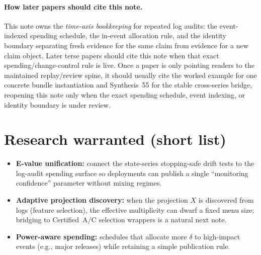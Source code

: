 \documentclass[11pt]{article}
\begin{document}
\paragraph{How later papers should cite this note.}
This note owns the \emph{time-axis bookkeeping} for repeated log audits: the event-indexed spending schedule, the in-event allocation rule, and the identity boundary separating fresh evidence for the same claim from evidence for a new claim object. Later terse papers should cite this note when that exact spending/change-control rule is live. Once a paper is only pointing readers to the maintained replay/review spine, it should usually cite the worked example for one concrete bundle instantiation and Synthesis~55 for the stable cross-series bridge, reopening this note only when the exact spending schedule, event indexing, or identity boundary is under review.\cite{series:workedexample,series:seriesspines}

\section{Research warranted (short list)}
\begin{itemize}[leftmargin=*]
\item \textbf{E-value unification:} connect the state-series stopping-safe drift tests to the log-audit spending surface so deployments can publish a single ``monitoring confidence'' parameter without mixing regimes.
\item \textbf{Adaptive projection discovery:} when the projection $X$ is discovered from logs (feature selection), the effective multiplicity can dwarf a fixed menu size; bridging to Certified~A/C selection wrappers is a natural next note.\cite{series:menus}
\item \textbf{Power-aware spending:} schedules that allocate more $\delta$ to high-impact events (e.g., major releases) while retaining a simple publication rule.
\end{itemize}
\end{document}
